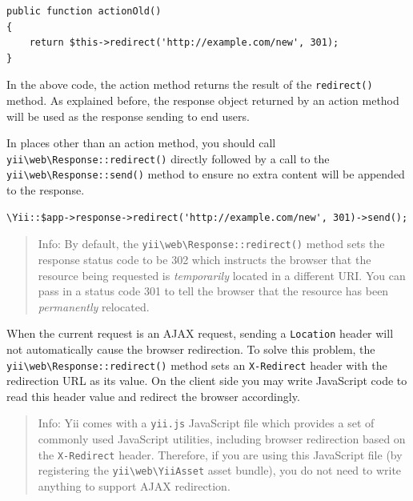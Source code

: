 \lstset{language=php}\begin{lstlisting}
public function actionOld()
{
    return $this->redirect('http://example.com/new', 301);
}
\end{lstlisting}
In the above code, the action method returns the result of the \lstinline|redirect()| method. As explained before, the response
object returned by an action method will be used as the response sending to end users.

In places other than an action method, you should call \texttt{yii{\allowbreak{}\textbackslash}web{\allowbreak{}\textbackslash}Response\allowbreak{}::\allowbreak{}redirect()} directly followed by 
a call to the \texttt{yii{\allowbreak{}\textbackslash}web{\allowbreak{}\textbackslash}Response\allowbreak{}::\allowbreak{}send()} method to ensure no extra content will be appended to the response.

\lstset{language=php}\begin{lstlisting}
\Yii::$app->response->redirect('http://example.com/new', 301)->send();
\end{lstlisting}
\begin{quote}Info: By default, the \texttt{yii{\allowbreak{}\textbackslash}web{\allowbreak{}\textbackslash}Response\allowbreak{}::\allowbreak{}redirect()} method sets the response status code to be 302 which instructs
  the browser that the resource being requested is \textit{temporarily} located in a different URI. You can pass in a status
  code 301 to tell the browser that the resource has been \textit{permanently} relocated.

\end{quote}
When the current request is an AJAX request, sending a \lstinline|Location| header will not automatically cause the browser
redirection. To solve this problem, the \texttt{yii{\allowbreak{}\textbackslash}web{\allowbreak{}\textbackslash}Response\allowbreak{}::\allowbreak{}redirect()} method sets an \lstinline|X-Redirect| header with 
the redirection URL as its value. On the client side you may write JavaScript code to read this header value and
redirect the browser accordingly.

\begin{quote}Info: Yii comes with a \lstinline|yii.js| JavaScript file which provides a set of commonly used JavaScript utilities,
  including browser redirection based on the \lstinline|X-Redirect| header. Therefore, if you are using this JavaScript file
  (by registering the \texttt{yii{\allowbreak{}\textbackslash}web{\allowbreak{}\textbackslash}YiiAsset} asset bundle), you do not need to write anything to support AJAX redirection.

\end{quote}
